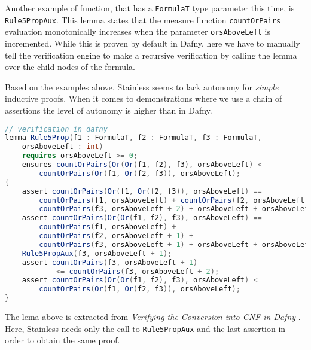 Another example of function, that has a \texttt{FormulaT} type parameter this time, is \texttt{Rule5PropAux}.
This lemma states that the measure function \texttt{countOrPairs} 
evaluation monotonically increases when the parameter \texttt{orsAboveLeft} is incremented.
While this is proven by default in Dafny, here we have to manually tell the verification engine 
to make a recursive verification by calling the lemma over the child nodes of the formula.


Based on the examples above, Stainless seems to lack autonomy for \emph{simple} inductive proofs.
When it comes to demonstrations where we use a chain of assertions the level of autonomy is higher 
than in Dafny.

\begin{lstlisting}[language=Scala, caption={Lemma \texttt{Rule5Prop}}]
// verification in dafny
lemma Rule5Prop(f1 : FormulaT, f2 : FormulaT, f3 : FormulaT,
    orsAboveLeft : int)
    requires orsAboveLeft >= 0;
    ensures countOrPairs(Or(Or(f1, f2), f3), orsAboveLeft) <
        countOrPairs(Or(f1, Or(f2, f3)), orsAboveLeft);
{
    assert countOrPairs(Or(f1, Or(f2, f3)), orsAboveLeft) ==
        countOrPairs(f1, orsAboveLeft) + countOrPairs(f2, orsAboveLeft + 1) +
        countOrPairs(f3, orsAboveLeft + 2) + orsAboveLeft + orsAboveLeft + 1;
    assert countOrPairs(Or(Or(f1, f2), f3), orsAboveLeft) ==
        countOrPairs(f1, orsAboveLeft) +
        countOrPairs(f2, orsAboveLeft + 1) +
        countOrPairs(f3, orsAboveLeft + 1) + orsAboveLeft + orsAboveLeft;
    Rule5PropAux(f3, orsAboveLeft + 1);
    assert countOrPairs(f3, orsAboveLeft + 1) 
            <= countOrPairs(f3, orsAboveLeft + 2); 
    assert countOrPairs(Or(Or(f1, f2), f3), orsAboveLeft) <
        countOrPairs(Or(f1, Or(f2, f3)), orsAboveLeft);
}
\end{lstlisting}

The lema above is extracted from \emph{Verifying the Conversion into CNF in Dafny} \cite{wollic}.
Here, Stainless needs only the call to \texttt{Rule5PropAux}
and the last assertion in order to obtain the same proof.